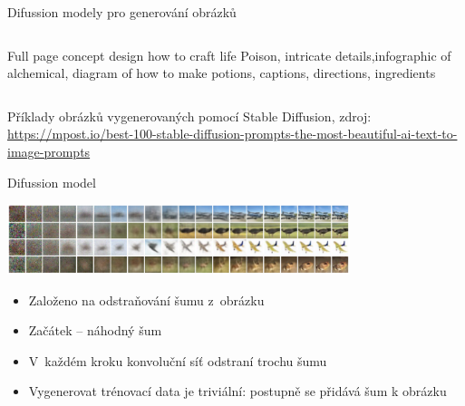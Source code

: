 \documentclass[aspectratio=169,dvipsnames]{beamer}
\begin{document}
\begin{frame}{Difussion modely pro generování obrázků}
\begin{columns}[t]
            \scriptsize Full page concept design how to craft life Poison,
            intricate details,infographic of alchemical, diagram of how to make
            potions, captions, directions, ingredients

    \end{columns}

    \tiny Příklady obrázků vygenerovaných pomocí Stable Diffusion, zdroj: \url{https://mpost.io/best-100-stable-diffusion-prompts-the-most-beautiful-ai-text-to-image-prompts}

\end{frame}


\begin{frame}{Difussion model}

    \begin{center}
        \includegraphics[width=10cm]{img/difusion.png} \\ \tiny \citep[Figure 6]{ho2020denoising}
    \end{center}

    \begin{itemize}[<+->]

        \item Založeno na odstraňování šumu z~obrázku

        \item Začátek -- náhodný šum

        \item V~každém kroku konvoluční síť odstraní trochu šumu

        \item Vygenerovat trénovací data je triviální: postupně se přidává šum k obrázku

    \end{itemize}


\end{frame}
\end{document}
